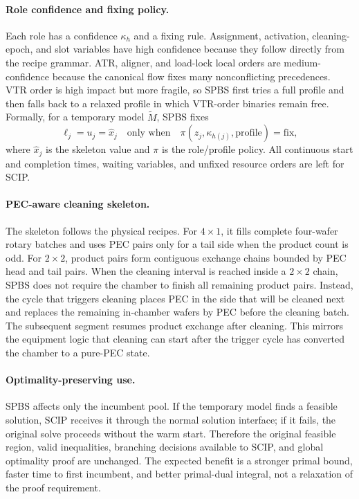 \documentclass[letterpaper]{article}
\begin{document}
\paragraph{Role confidence and fixing policy.}
Each role has a confidence $\kappa_h$ and a fixing rule.
Assignment, activation, cleaning-epoch, and slot variables have high confidence because they follow directly from the recipe grammar.
ATR, aligner, and load-lock local orders are medium-confidence because the canonical flow fixes many nonconflicting precedences.
VTR order is high impact but more fragile, so SPBS first tries a full profile and then falls back to a relaxed profile in which VTR-order binaries remain free.
Formally, for a temporary model $\tilde M$, SPBS fixes
\[
\ell_j=u_j=\hat x_j
\quad\text{only when}\quad
\pi(z_j,\kappa_{h(j)},\mathrm{profile})=\mathrm{fix},
\]
where $\hat x_j$ is the skeleton value and $\pi$ is the role/profile policy.
All continuous start and completion times, waiting variables, and unfixed resource orders are left for SCIP.

\paragraph{PEC-aware cleaning skeleton.}
The skeleton follows the physical recipes.
For $4\times1$, it fills complete four-wafer rotary batches and uses PEC pairs only for a tail side when the product count is odd.
For $2\times2$, product pairs form contiguous exchange chains bounded by PEC head and tail pairs.
When the cleaning interval is reached inside a $2\times2$ chain, SPBS does not require the chamber to finish all remaining product pairs.
Instead, the cycle that triggers cleaning places PEC in the side that will be cleaned next and replaces the remaining in-chamber wafers by PEC before the cleaning batch.
The subsequent segment resumes product exchange after cleaning.
This mirrors the equipment logic that cleaning can start after the trigger cycle has converted the chamber to a pure-PEC state.

\paragraph{Optimality-preserving use.}
SPBS affects only the incumbent pool.
If the temporary model finds a feasible solution, SCIP receives it through the normal solution interface; if it fails, the original solve proceeds without the warm start.
Therefore the original feasible region, valid inequalities, branching decisions available to SCIP, and global optimality proof are unchanged.
The expected benefit is a stronger primal bound, faster time to first incumbent, and better primal-dual integral, not a relaxation of the proof requirement.
\end{document}
